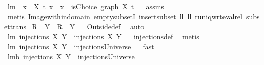 \begin{isabellebody}
%
\isadelimproof
\isanewline
%
\endisadelimproof
{}\isamarkupfalse%
\ lm{}{}{\isacharcolon}\ \ {\isachardoublequoteopen}{\isasymforall}x\ {\isasymin}\ X{\isachardot}\ t\ x\ {\isasymin}\ x{\isachardoublequoteclose}\ \ {\isachardoublequoteopen}isChoice\ {\isacharparenleft}graph\ X\ t{\isacharparenright}{\isachardoublequoteclose}%
\isadelimproof
\ %
\endisadelimproof
%
\isatagproof
{}\isamarkupfalse%
\ assms\isanewline
{}\isamarkupfalse%
\ {\isacharparenleft}metis\ Image{\isacharunderscore}within{\isacharunderscore}domain{\isacharprime}\ empty{\isacharunderscore}subsetI\ insert{\isacharunderscore}subset\ ll{}{}\ ll{}{}\ runiq{\isacharunderscore}wrt{\isacharunderscore}eval{\isacharunderscore}rel\ subset{\isacharunderscore}trans{\isacharparenright}%
\endisatagproof
{\isafoldproof}%
%
\isadelimproof
%
\endisadelimproof
\isanewline
\isanewline
{}\isamarkupfalse%
\ {\isachardoublequoteopen}R\ {\isacharbar}{\isacharminus}\ Y\ {\isacharequal}\ {\isacharparenleft}R{\isacharcircum}{\isacharminus}{}\ {\isacharminus}{\isacharbar}\ Y{\isacharparenright}{\isacharcircum}{\isacharminus}{}{\isachardoublequoteclose}%
\isadelimproof
\ %
\endisadelimproof
%
\isatagproof
{}\isamarkupfalse%
\ Outside{\isacharunderscore}def\ \isamarkupfalse%
\ auto%
\endisatagproof
{\isafoldproof}%
%
\isadelimproof
%
\endisadelimproof
\isanewline
{}\isamarkupfalse%
\ lm{}{}{\isacharcolon}\ {\isachardoublequoteopen}injections{\isacharprime}\ X\ Y\ {\isacharequal}\ injections\ X\ Y{\isachardoublequoteclose}%
\isadelimproof
\ %
\endisadelimproof
%
\isatagproof
{}\isamarkupfalse%
\ injections{\isacharunderscore}def\ \isamarkupfalse%
\ metis%
\endisatagproof
{\isafoldproof}%
%
\isadelimproof
%
\endisadelimproof
\isanewline
{}\isamarkupfalse%
\ lm{}{}{\isacharcolon}\ {\isachardoublequoteopen}injections{\isacharprime}\ X\ Y\ {\isasymsubseteq}\ injectionsUniverse{\isachardoublequoteclose}%
\isadelimproof
\ %
\endisadelimproof
%
\isatagproof
{}\isamarkupfalse%
\ fast%
\endisatagproof
{\isafoldproof}%
%
\isadelimproof
%
\endisadelimproof
\isanewline
{}\isamarkupfalse%
\ lm{}{}b{\isacharcolon}\ {\isachardoublequoteopen}injections\ X\ Y\ {\isasymsubseteq}\ injectionsUniverse{\isachardoublequoteclose}%
\isadelimproof
\ %
\endisadelimproof

\end{isabellebody}
